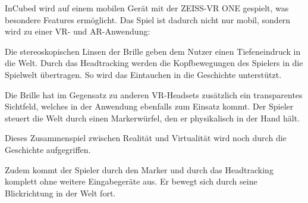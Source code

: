 
InCubed wird auf einem mobilen Gerät mit der ZEISS-VR ONE gespielt, was besondere Features ermöglicht. Das Spiel ist dadurch nicht nur mobil, sondern wird zu einer VR- und AR-Anwendung:

Die stereoskopischen Linsen der Brille geben dem Nutzer einen Tiefeneindruck in die Welt. Durch das Headtracking werden die Kopfbewegungen des Spielers in die Spielwelt übertragen. So wird das Eintauchen in die Geschichte unterstützt.

Die Brille hat im Gegensatz zu anderen VR-Headsets zusätzlich ein transparentes Sichtfeld, welches in der Anwendung ebenfalls zum Einsatz kommt. Der Spieler steuert die Welt durch einen Markerwürfel, den er physikalisch in der Hand hält. 

Dieses Zusammenspiel zwischen Realität und Virtualität wird noch durch die Geschichte aufgegriffen.

Zudem kommt der Spieler durch den Marker und durch das Headtracking komplett ohne weitere Eingabegeräte aus. Er bewegt sich durch seine Blickrichtung in der Welt fort.